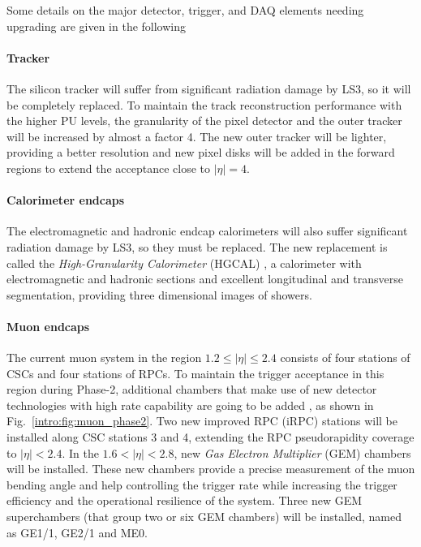 \documentclass[../main.tex]{subfiles}
\begin{document}
Some details on the major detector, trigger, and DAQ elements needing upgrading are given in the following

\paragraph{Tracker}

The silicon tracker will suffer from significant radiation damage by LS3, so it will be completely replaced. To maintain the track reconstruction performance with the higher PU levels, the granularity of the pixel detector and the outer tracker will be increased by almost a factor 4. The new outer tracker will be lighter, providing a better resolution and new pixel disks will be added in the forward regions to extend the acceptance close to $|\eta| = 4$.

\paragraph{Calorimeter endcaps}

The electromagnetic and hadronic endcap calorimeters will also suffer significant radiation damage by LS3, so they must be replaced. The new replacement is called the \textit{High-Granularity Calorimeter} (HGCAL) \cite{intro:exp:hgcal}, a calorimeter with electromagnetic and hadronic sections and excellent longitudinal and transverse segmentation, providing three dimensional images of showers.

\paragraph{Muon endcaps}

The current muon system in the region $1.2\leq|\eta|\leq2.4$ consists of four stations of CSCs and four stations of RPCs. To maintain the trigger acceptance in this region during Phase-2, additional chambers that make use of new detector technologies with high rate capability are going to be added \cite{muontdr}, as shown in Fig.~\ref{intro:fig:muon_phase2}. Two new improved RPC (iRPC) stations will be installed along CSC stations 3 and 4, extending the RPC pseudorapidity coverage to $|\eta|<2.4$. In the $1.6<|\eta|<2.8$, new \textit{Gas Electron Multiplier} (GEM) chambers will be installed. These new chambers provide a precise measurement of the muon bending angle and help controlling the trigger rate while increasing the trigger efficiency and the operational resilience of the system. Three new GEM superchambers (that group two or six GEM chambers) will be installed, named as GE1/1, GE2/1 and ME0.
\end{document}
